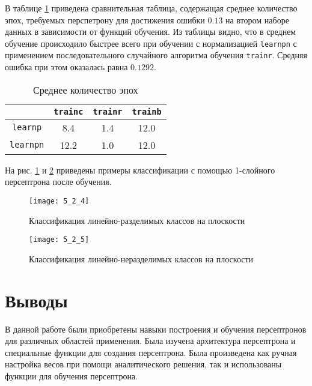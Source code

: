 В таблице \ref{tab:6_2_2} приведена сравнительная таблица, содержащая среднее количество эпох, требуемых перспетрону для достижения ошибки $0.13$ на втором наборе данных в зависимости от функций обучения. Из таблицы видно, что в среднем обучение происходило быстрее всего при обучении с нормализацией \verb+learnpn+ с применением последовательного случайного алгоритма обучения \verb+trainr+. Средняя ошибка при этом оказалась равна $0.1292$.

\begin{table}[H]
\begin{center}
	\def\tabcolsep{15pt}
	\caption{Среднее количество эпох}
	\label{tab:6_2_2}
	\begin{tabular}{|c|c|c|c|}
		\hline
		 & \verb+trainc+ & \verb+trainr+ & \verb+trainb+ \\
		\hline
		\verb+learnp+ & 8.4 & 1.4 & 12.0 \\
		\hline
		\verb+learnpn+ & 12.2 & 1.0 & 12.0 \\
		\hline
	\end{tabular}
\end{center}
\end{table} 

На рис. \ref{fig:5_2_4} и \ref{fig:5_2_5} приведены примеры классификации с помощью 1-слойного персептрона после обучения.
\begin{figure}[H]
\begin{center}
	\texttt{[image: 5\_2\_4]}
	\caption{Классификация линейно-разделимых классов на плоскости}
	\label{fig:5_2_4}
\end{center}
\end{figure}
\vspace{-1cm}
\begin{figure}[H]
\begin{center}
	\texttt{[image: 5\_2\_5]}
	\caption{Классификация линейно-неразделимых классов на плоскости}
	\label{fig:5_2_5}
\end{center}
\end{figure}

\section{Выводы}

В данной работе были приобретены навыки построения и обучения персептронов для различных областей применения. Была изучена архитектура персептрона и специальные функции для создания персептрона. Была произведена как ручная настройка весов при помощи аналитического решения, так и использованы функции для обучения персептрона. 

